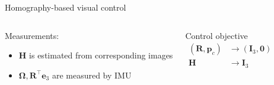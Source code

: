 \documentclass{beamer}
\begin{document}
\begin{frame}{Homography-based visual control}
\begin{columns}
	\begin{exampleblock}{Measurements:}
		\begin{itemize}
			\item $\mathbf{H}$ {\footnotesize is estimated from corresponding images}
			\item $\mathbf{\Omega}, \mathbf{R}^\top \mathbf{e}_3 $ {\footnotesize are measured by IMU}
		\end{itemize}
	\end{exampleblock}
	\pause
	\begin{exampleblock}{Control objective}\vspace{-0.0cm}
		\[
		\begin{array}{rl}
		(\mathbf{R}, \mathbf{p}_c) & \longrightarrow (\mathbf{I}_3, \mathbf{0})\\
		\mathbf{H} & \longrightarrow \mathbf{I}_3\\
		\end{array}
		\]	
	\end{exampleblock}
	
\end{columns}

\end{frame}
\end{document}
